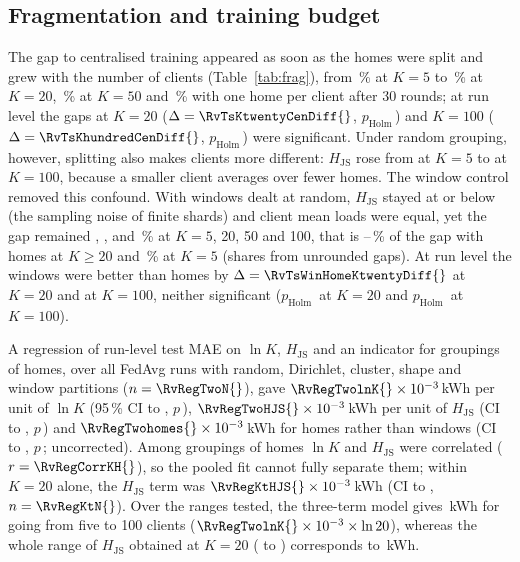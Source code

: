 \subsection{Fragmentation and training budget}
The gap to centralised training appeared as soon as the homes were split and grew with the number of clients
(Table~\ref{tab:frag}), from \RvHomeKfiveGap{}\,\% at $K=5$ to \RvHomeKtwentyGap{}\,\% at $K=20$,
\RvHomeKfiftyGap{}\,\% at $K=50$ and \RvHomeKhundredGap{}\,\% with one home per client after 30 rounds; at run level the
gaps at $K=20$ ($\Delta=\RvTsKtwentyCenDiff{}$, $p_{\mathrm{Holm}}$\,\RvTsKtwentyCenP{}) and $K=100$
($\Delta=\RvTsKhundredCenDiff{}$, $p_{\mathrm{Holm}}$\,\RvTsKhundredCenP{}) were significant. Under random
grouping, however, splitting also makes clients more different: $H_{\mathrm{JS}}$ rose from \RvHJSHomeKfive{} at $K=5$ to
\RvHJSHomeKhundred{} at $K=100$, because a smaller client averages over fewer homes. The window control removed this
confound. With windows dealt at random, $H_{\mathrm{JS}}$ stayed at or below \RvWinKhundredHJS{} (the sampling noise of
finite shards) and client mean loads were equal, yet the gap remained \RvWinKfiveGap{}, \RvWinKtwentyGap{},
\RvWinKfiftyGap{} and \RvWinKhundredGap{}\,\% at $K=5$, 20, 50 and 100, that is \RvWinShareLo{}--\RvWinShareHi{}\,\% of
the gap with homes at $K\ge20$ and \RvWinKfiveShare{}\,\% at $K=5$ (shares from unrounded gaps). At run level the
windows were better than homes by $\Delta=\RvTsWinHomeKtwentyDiff{}$ at $K=20$ and \RvTsWinHomeKhundredDiff{} at
$K=100$, neither significant ($p_{\mathrm{Holm}}$\,\RvTsWinHomeKtwentyP{} at $K=20$ and $p_{\mathrm{Holm}}$\,\RvTsWinHomeKhundredP{} at $K=100$).

A regression of run-level test MAE on $\ln K$, $H_{\mathrm{JS}}$ and an indicator for groupings of homes, over all FedAvg
runs with random, Dirichlet, cluster, shape and window partitions ($n=\RvRegTwoN{}$), gave $\RvRegTwolnK{}\times10^{-3}$\,kWh
per unit of $\ln K$ (95\,\% CI \RvRegTwolnKlo{} to \RvRegTwolnKhi{}, $p$\,\RvRegTwolnKP{}),
$\RvRegTwoHJS{}\times10^{-3}$\,kWh per unit of $H_{\mathrm{JS}}$ (CI \RvRegTwoHJSlo{} to \RvRegTwoHJShi{}, $p$\,\RvRegTwoHJSP{})
and $\RvRegTwohomes{}\times10^{-3}$\,kWh for homes rather than windows (CI \RvRegTwohomeslo{} to \RvRegTwohomeshi{},
$p$\,\RvRegTwohomesP{}; uncorrected). Among groupings of homes $\ln K$ and $H_{\mathrm{JS}}$ were correlated
($r=\RvRegCorrKH{}$), so the pooled fit cannot fully separate them; within $K=20$ alone, the $H_{\mathrm{JS}}$ term was
$\RvRegKtHJS{}\times10^{-3}$\,kWh (CI \RvRegKtHJSlo{} to \RvRegKtHJShi{}, $n=\RvRegKtN{}$). Over the ranges tested,
the three-term model gives \RvRegTwoEffK{}\,kWh for going from five to 100 clients ($\RvRegTwolnK{}\times10^{-3}\times\ln 20$),
whereas the whole range of $H_{\mathrm{JS}}$ obtained at $K=20$ (\RvRegHJSRangeLo{} to \RvRegHJSRangeHi{}) corresponds to
\RvRegTwoEffH{}\,kWh.

